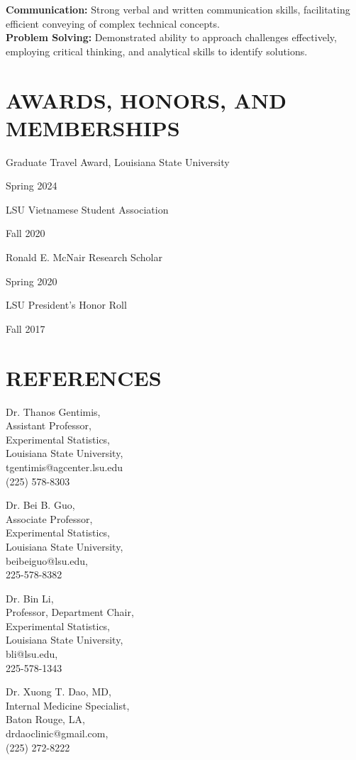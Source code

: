 \documentclass[paper=a4,fontsize=11pt]{scrartcl}
\newcommand{\NewPart}[1]{\section*{\uppercase{#1}}}
\newcommand{\PubEntry}[2]{
\parbox{0.8\textwidth}{#1\\} \hfill #2\\}
\begin{document}
\textbf{Communication:} Strong verbal and written communication skills, facilitating efficient conveying of complex technical concepts.\\

\textbf{Problem Solving:} Demonstrated ability to approach challenges effectively, employing critical thinking, and analytical skills to identify solutions.\\


\NewPart{Awards, honors, and memberships}
\PubEntry{Graduate Travel Award, Louisiana State University}{Spring 2024}
\PubEntry{LSU Vietnamese Student Association}{Fall 2020}
\PubEntry{Ronald E. McNair Research Scholar}{Spring 2020} 
\PubEntry{LSU President’s Honor Roll}{Fall 2017}



\NewPart{References}

Dr. Thanos Gentimis, \\
Assistant Professor, \\
Experimental Statistics, \\
Louisiana State University, \\
tgentimis@agcenter.lsu.edu\\
(225) 578-8303\\



\vspace{0.3cm}

Dr. Bei B. Guo,\\
Associate Professor, \\
Experimental Statistics,\\
Louisiana State University, \\
beibeiguo@lsu.edu, \\
225-578-8382 \\

\vspace{0.3cm}

\newpage

Dr. Bin Li, \\
Professor, Department Chair, \\
Experimental Statistics,\\
Louisiana State University, \\
bli@lsu.edu, \\
225-578-1343\\

\vspace{0.3cm}

Dr. Xuong T. Dao, MD, \\
Internal Medicine Specialist, \\
Baton Rouge, LA, \\
drdaoclinic@gmail.com, \\
(225) 272-8222\\
\end{document}
